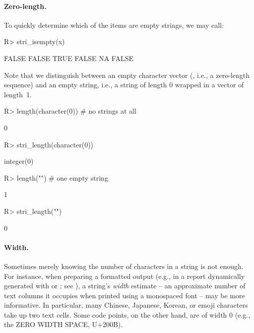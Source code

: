 \documentclass[nojss]{jss}\usepackage[]{graphicx}\usepackage[]{color}
\begin{document}
\paragraph{Zero-length.}
To quickly determine which of the items are empty strings, we may call:

\begin{Schunk}
\begin{Sinput}
R> stri_isempty(x)
\end{Sinput}
\begin{Soutput}
[1] FALSE FALSE  TRUE FALSE    NA FALSE
\end{Soutput}
\end{Schunk}

\noindent
Note that we distinguish between an empty character vector
(, i.e., a zero-length sequence)
and an empty string, i.e., a string of length 0 wrapped in a vector
of length~1.

\begin{Schunk}
\begin{Sinput}
R> length(character(0))      # no strings at all
\end{Sinput}
\begin{Soutput}
[1] 0
\end{Soutput}
\begin{Sinput}
R> stri_length(character(0))
\end{Sinput}
\begin{Soutput}
integer(0)
\end{Soutput}
\begin{Sinput}
R> length("")                # one empty string
\end{Sinput}
\begin{Soutput}
[1] 1
\end{Soutput}
\begin{Sinput}
R> stri_length("")
\end{Sinput}
\begin{Soutput}
[1] 0
\end{Soutput}
\end{Schunk}


\paragraph{Width.}
Sometimes merely knowing  the number of characters in a string is not enough.
For instance, when preparing a formatted output (e.g., in a report dynamically
generated  with  or ; see \citealp{knitr}),
a string's \textit{width} estimate -- an approximate number of text columns
it occupies when printed using a monospaced font -- may be more informative.
In particular, many Chinese, Japanese, Korean, or emoji
characters take up two text cells. Some code points, on the other hand,
are of width 0 (e.g., the ZERO WIDTH SPACE, U+200B).
\end{document}
